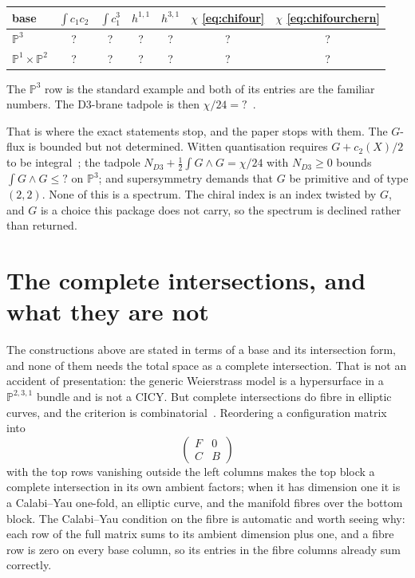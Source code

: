 \documentclass[11pt,a4paper]{article}
\newcommand{\SFPThreeCoCt}{?}\newcommand{\SFPThreeCoCube}{?}
\newcommand{\SFPThreeHone}{?}\newcommand{\SFPThreeHthree}{?}
\newcommand{\SFPThreeChi}{?}\newcommand{\SFPThreeChiChern}{?}
\newcommand{\SFPThreeTadpole}{?}\newcommand{\SFPThreeAgree}{?}
\newcommand{\SFPOneTwoCoCt}{?}\newcommand{\SFPOneTwoCoCube}{?}
\newcommand{\SFPOneTwoHone}{?}\newcommand{\SFPOneTwoHthree}{?}
\newcommand{\SFPOneTwoChi}{?}\newcommand{\SFPOneTwoChiChern}{?}
\newcommand{\SFPThreeFluxBound}{?}\newcommand{\SFQuinticFixedChi}{?}
\newcommand{\PP}{\mathbb{P}}
\theoremstyle{definition}
\begin{document}
\begin{center}
\begin{tabular}{lcccccc}
\toprule
base & $\int c_1 c_2$ & $\int c_1^3$ & $h^{1,1}$ & $h^{3,1}$
& $\chi$ \eqref{eq:chifour} & $\chi$ \eqref{eq:chifourchern} \\
\midrule
$\PP^3$
& \SFPThreeCoCt & \SFPThreeCoCube & \SFPThreeHone & \SFPThreeHthree
& \SFPThreeChi & \SFPThreeChiChern \\
$\PP^1 \times \PP^2$
& \SFPOneTwoCoCt & \SFPOneTwoCoCube & \SFPOneTwoHone & \SFPOneTwoHthree
& \SFPOneTwoChi & \SFPOneTwoChiChern \\
\bottomrule
\end{tabular}
\end{center}

\noindent
The $\PP^3$ row is the standard example and both of its entries are the
familiar numbers. The D3-brane tadpole is then
$\chi/24 = \SFPThreeTadpole$~\cite{SethiVafaWitten1996}.

That is where the exact statements stop, and the paper stops with them. The
$G$-flux is bounded but not determined. Witten quantisation requires
$G + c_2(X)/2$ to be integral~\cite{Witten1996flux}; the tadpole
$N_{D3} + \tfrac12 \int G \wedge G = \chi/24$ with $N_{D3} \geq 0$ bounds
$\int G \wedge G \leq \SFPThreeFluxBound$ on $\PP^3$; and supersymmetry
demands that $G$ be primitive and of type $(2,2)$. None of this is a spectrum.
The chiral index is an index twisted by $G$, and $G$ is a choice this package
does not carry, so the spectrum is declined rather than returned.


\section{The complete intersections, and what they are not}
\label{sec:cicy}

The constructions above are stated in terms of a base and its intersection
form, and none of them needs the total space as a complete intersection.
That is not an accident of presentation: the generic Weierstrass model is a
hypersurface in a $\PP^{2,3,1}$ bundle and is not a CICY. But complete
intersections do fibre in elliptic curves, and the criterion is
combinatorial~\cite{AndersonGaoGrayLee2017}. Reordering a configuration matrix
into
%
\begin{equation}
\begin{pmatrix} F & 0 \\ C & B \end{pmatrix}
\label{eq:fibblock}
\end{equation}
%
with the top rows vanishing outside the left columns makes the top block a
complete intersection in its own ambient factors; when it has dimension one it
is a Calabi--Yau one-fold, an elliptic curve, and the manifold fibres over the
bottom block. The Calabi--Yau condition on the fibre is automatic and worth
seeing why: each row of the full matrix sums to its ambient dimension plus
one, and a fibre row is zero on every base column, so its entries in the fibre
columns already sum correctly.
\end{document}
